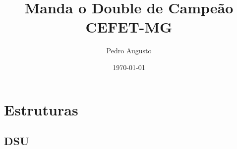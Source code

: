 \documentclass[11pt, a4paper, twoside]{article}
\title{Manda o Double de Campeão \\ CEFET-MG}
\author{Pedro Augusto}
\begin{document}
\twocolumn
\date{\today}
\maketitle


\renewcommand{\contentsname}{Índice} %
\tableofcontents


%
%

\section{Estruturas}

\subsection{DSU}
\end{document}
